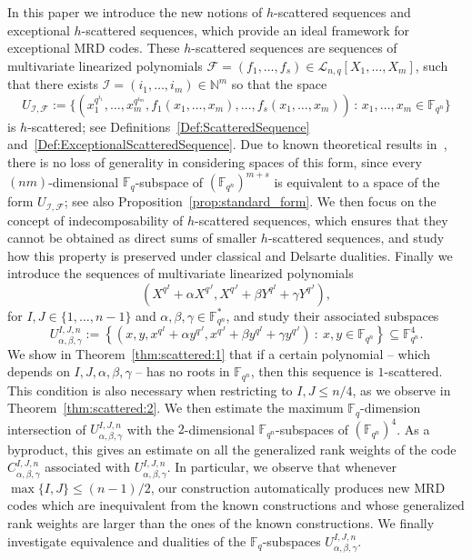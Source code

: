 In this paper we introduce the new notions of $h$-scattered sequences and exceptional $h$-scattered sequences, which provide an ideal framework for exceptional MRD codes. These $h$-scattered sequences are sequences of multivariate linearized polynomials $\mathcal F=(f_1,\ldots, f_s)\in \mathcal{L}_{n,q}[X_1,\ldots,X_m]$, such that there exists 
$\mathcal I=(i_1,\ldots, i_m) \in \mathbb{N}^m$ so that the space 
$$ U_{\mathcal I,\mathcal F}:=\{ (x_1^{q^{i_1}}, \ldots,x_m^{q^{i_m}},f_1(x_1,\ldots,x_m), \ldots,f_s(x_1,\ldots,x_m) ) \, : \, x_1,\ldots,x_m \in {\mathbb F}_{q^n}\}$$
is $h$-scattered; see Definitions~\ref{Def:ScatteredSequence} and~\ref{Def:ExceptionalScatteredSequence}. Due to known theoretical results in~\cite{alfarano2023critical,polverino2010linear}, there is no loss of generality in considering spaces of this form, since every $(nm)$-dimensional $\mathbb{F}_q$-subspace of $(\mathbb{F}_{q^n})^{m+s}$ is equivalent to a space of the form $U_{\mathcal I,\mathcal F}$; see also Proposition~\ref{prop:standard_form}. 
We then focus on the concept of indecomposability of $h$-scattered sequences, which ensures that they cannot be obtained as direct sums of smaller $h$-scattered sequences, and study how this property is preserved under classical and Delsarte dualities.  
Finally we introduce  the sequences of multivariate linearized polynomials 
$$  (X^{q^I}+\alpha X^{q^J}, X^{q^J}+\beta Y^{q^I}+\gamma Y^{q^J}),$$
for $I,J\in\{1,\ldots,n-1\}$ and $\alpha, \beta,\gamma\in {\mathbb F}_{q^n}^*$, and study their associated subspaces 
$$    U_{\alpha, \beta, \gamma}^{I,J,n}:=\left\{\left(x,y,x^{q^I}+\alpha y^{q^J},x^{q^J}+\beta y^{q^I} + \gamma y^{q^J}\right) \ : \ x,y\in \mathbb{F}_{q^n}\right\}\subseteq {\mathbb F}_{q^n}^4.$$
We show in Theorem~\ref{thm:scattered:1} that if a certain polynomial -- which depends on $I,J,\alpha,\beta,\gamma$ -- has no roots in ${\mathbb F}_{q^n}$, then this sequence is $1$-scattered.  This condition is also necessary when restricting to $I,J\leq n/4$, as we observe in Theorem~\ref{thm:scattered:2}. 
We then estimate the maximum $\mathbb{F}_q$-dimension intersection of $U_{\alpha, \beta, \gamma}^{I,J,n}$ with the $2$-dimensional ${\mathbb F}_{q^n}$-subspaces of $(\mathbb{F}_{q^n})^4$. As a byproduct, this gives an estimate on all the generalized rank weights of the code $C_{\alpha, \beta, \gamma}^{I,J,n}$ associated with $U_{\alpha, \beta, \gamma}^{I,J,n}$. In particular, we observe that whenever $\max\{I,J\}\leq (n-1)/2$, our construction automatically produces new MRD codes which are inequivalent from the known constructions and whose generalized rank weights are larger than the ones of the known constructions. We finally investigate equivalence and dualities of the $\mathbb{F}_q$-subspaces $U_{\alpha, \beta, \gamma}^{I,J,n}$.

